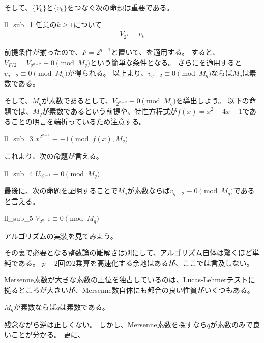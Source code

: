 そして、$\{V_k\}$と$\{v_k\}$をつなぐ次の命題は重要である。

\begin{Prop}{}{ll_sub_1}
任意の$k\ge1$について
\begin{align*}
V_{2^k} = v_k
\end{align*}
\end{Prop}

前提条件が揃ったので、$F=2^{q-1}$と置いて、を適用する。
すると、$V_{F/2} = V_{2^{q-2}} \equiv 0 \pmod{M_q}$という簡単な条件となる。
さらにを適用すると$v_{q-2} \equiv 0 \pmod{M_q}$が得られる。
以上より、$v_{q-2} \equiv 0 \pmod{M_q}$ならば$M_q$は素数である。

そして、$M_q$が素数であるとして、$V_{2^{q-2}}\equiv0\pmod{M_q}$を導出しよう。
以下の命題では、$M_q$が素数であるという前提や、特性方程式が$f(x)=x^2-4x+1$であることの明言を端折っているため注意する。

\begin{Prop}{}{ll_sub_3}
$x^{2^{q-1}}\equiv-1\pmod{f(x),M_q}$
\end{Prop}

これより、次の命題が言える。

\begin{Prop}{}{ll_sub_4}
$U_{2^{q-1}}\equiv0\pmod{M_q}$
\end{Prop}

最後に、次の命題を証明することで$M_q$が素数ならば$v_{q-2} \equiv 0 \pmod{M_q}$であると言える。

\begin{Prop}{}{ll_sub_5}
$V_{2^{q-2}}\equiv0\pmod{M_q}$
\end{Prop}

アルゴリズムの実装を見てみよう。


その裏で必要となる整数論の難解さは別にして、アルゴリズム自体は驚くほど単純である。
$p-2$回の2乗算を高速化する余地はあるが、ここでは言及しない。

Mersenne素数が大きな素数の上位を独占しているのは、Lucas-Lehmerテストに拠るところが大きいが、Mersenne数自体にも都合の良い性質がいくつもある。

\begin{Prop}{}{}
$M_q$が素数ならば$q$は素数である。
\end{Prop}

残念ながら逆は正しくない。
しかし、Mersenne素数を探すなら$q$が素数のみで良いことが分かる。
更に、


